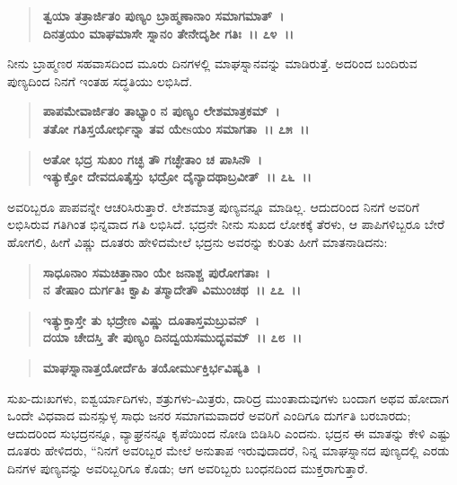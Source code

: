 \begin{verse}
\textbf{ತ್ವಯಾ ತತ್ರಾರ್ಜಿತಂ ಪುಣ್ಯಂ ಬ್ರಾಹ್ಮಣಾನಾಂ ಸಮಾಗಮಾತ್~।}\\\textbf{ದಿನತ್ರಯಂ ಮಾಘಮಾಸೇ ಸ್ನಾನಂ ತೇನೇದೃಶೀ ಗತಿಃ~।। ೭೪~।।}
\end{verse}

ನೀನು ಬ್ರಾಹ್ಮಣರ ಸಹವಾಸದಿಂದ ಮೂರು ದಿನಗಳಲ್ಲಿ ಮಾಘಸ್ನಾನವನ್ನು ಮಾಡಿರುತ್ತೆ. ಅದರಿಂದ ಬಂದಿರುವ ಪುಣ್ಯದಿಂದ ನಿನಗೆ ಇಂತಹ ಸದ್ಧತಿಯು ಲಭಿಸಿದೆ.

\begin{verse}
\textbf{ಪಾಪಮೇವಾರ್ಜಿತಂ ತಾಭ್ಯಾಂ ನ ಪುಣ್ಯಂ ಲೇಶಮಾತ್ರಕಮ್~।}\\\textbf{ತತೋ ಗತಿಸ್ತಯೋರ್ಭಿನ್ನಾ ತವ ಯೇsಯಂ ಸಮಾಗತಾ~।। ೭೫~।। }
\end{verse}

\begin{verse}
\textbf{ಅತೋ ಭದ್ರ ಸುಖಂ ಗಚ್ಛ ತೌ ಗಚ್ಛೇತಾಂ ಚ ಪಾಸಿನೌ~।}\\\textbf{ಇತ್ಯುಕ್ತೋ ದೇವದೂತೈಸ್ತು ಭದ್ರೋ ದೈನ್ಯಾದಥಾಬ್ರವೀತ್~।। ೭೬~।।}
\end{verse}

ಅವರಿಬ್ಬರೂ ಪಾಪವನ್ನೇ ಆಚರಿಸಿರುತ್ತಾರೆ. ಲೇಶಮಾತ್ರ ಪುಣ್ಯವನ್ನೂ ಮಾಡಿಲ್ಲ. ಆದುದರಿಂದ ನಿನಗೆ ಅವರಿಗೆ ಲಭಿಸಿರುವ ಗತಿಗಿಂತ ಭಿನ್ನವಾದ ಗತಿ ಲಭಿಸಿದೆ. ಭದ್ರನೇ ನೀನು ಸುಖದ ಲೋಕಕ್ಕೆ ತೆರಳು, ಆ ಪಾಪಿಗಳಿಬ್ಬರೂ ಬೇರೆ ಹೋಗಲಿ, ಹೀಗೆ ವಿಷ್ಣು ದೂತರು ಹೇಳಿದಮೇಲೆ ಭದ್ರನು ಅವರನ್ನು ಕುರಿತು ಹೀಗೆ ಮಾತನಾಡಿದನು:

\begin{verse}
\textbf{ಸಾಧೂನಾಂ ಸಮಚಿತ್ತಾನಾಂ ಯೇ ಜನಾಶ್ಚ ಪುರೋಗತಾಃ~।}\\\textbf{ನ ತೇಷಾಂ ದುರ್ಗತಿಃ ಕ್ವಾಪಿ ತಸ್ಮಾದೇತೌ ವಿಮುಂಚಥ~।। ೭೭~।।} 
\end{verse}

\begin{verse}
\textbf{ಇತ್ಯುಕ್ತಾಸ್ತೇ ತು ಭದ್ರೇಣ ವಿಷ್ಣು ದೂತಾಸ್ತಮಬ್ರುವನ್~।}\\\textbf{ದಯಾ ಚೇದಸ್ತಿ ತೇ ಪುಣ್ಯಂ ದಿನದ್ವಯಸಮುದ್ಭವಮ್~।। ೭೮~।। }
\end{verse}

\begin{verse}
\textbf{ಮಾಘಸ್ನಾನಾತ್ತಯೋರ್ದೆಹಿ ತಯೋರ್ಮುಕ್ತಿರ್ಭವಿಷ್ಯತಿ~।}
\end{verse}

ಸುಖ-ದುಃಖಗಳು, ಐಶ್ವರ್ಯಾದಿಗಳು, ಶತ್ರುಗಳು-ಮಿತ್ರರು, ದಾರಿದ್ರ ಮುಂತಾದುವುಗಳು ಬಂದಾಗ ಅಥವ ಹೋದಾಗ ಒಂದೇ ವಿಧವಾದ ಮನಸ್ಸುಳ್ಳ ಸಾಧು ಜನರ ಸಮಾಗಮವಾದರೆ ಅವರಿಗೆ ಎಂದಿಗೂ ದುರ್ಗತಿ ಬರಬಾರದು; ಆದುದರಿಂದ ಸುಭದ್ರನನ್ನೂ, ವ್ಯಾಘ್ರನನ್ನೂ ಕೃಪೆಯಿಂದ ನೋಡಿ ಬಿಡಿಸಿರಿ ಎಂದನು. ಭದ್ರನ ಈ ಮಾತನ್ನು ಕೇಳಿ ಎಷ್ಟು ದೂತರು ಹೇಳಿದರು, “ನಿನಗೆ ಅವರಿಬ್ಬರ ಮೇಲೆ ಅನುತಾಪ ಇರುವುದಾದರೆ, ನಿನ್ನ ಮಾಘಸ್ನಾನದ ಪುಣ್ಯದಲ್ಲಿ ಎರಡು ದಿನಗಳ ಪುಣ್ಯವನ್ನು ಅವರಿಬ್ಬರಿಗೂ ಕೊಡು; ಆಗ ಅವರಿಬ್ಬರು ಬಂಧನದಿಂದ ಮುಕ್ತರಾಗುತ್ತಾರೆ.

